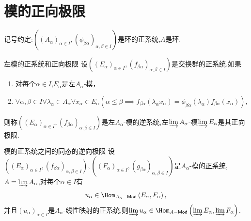 \section{模的正向极限}

记号约定:$\left(\left(A_{\alpha}\right)_{\alpha\in I},\left(\phi_{\beta\alpha}\right)_{\alpha,\beta\in I}\right)$是环的正系统,$A$是环.

\begin{definition}{左模的正系统和正向极限}{}
	设$\left(\left(E_{\alpha}\right)_{\alpha\in I},\left(f_{\beta\alpha}\right)_{\alpha,\beta\in I}\right)$是交换群的正系统.如果
	\begin{enumerate}
		\item 对每个$\alpha\in I$,$E_{\alpha}$是左$A_{\alpha}$-模，
		\item $\forall\alpha,\beta\in I\forall\lambda_{\alpha}\in A_{\alpha}\forall x_{\alpha}\in E_{\alpha}\left(\alpha\leq\beta\implies f_{\beta\alpha}\left(\lambda_{\alpha}x_{\alpha}\right)=\phi_{\beta\alpha}\left(\lambda_{\alpha}\right)f_{\beta\alpha}\left(x_{\alpha}\right)\right)$,
	\end{enumerate}
	则称$\left(\left(E_{\alpha}\right)_{\alpha\in I},\left(f_{\beta\alpha}\right)_{\alpha,\beta\in I}\right)$是左$A_{\alpha}$-模的逆系统,左$\varinjlim A_{\alpha}$-模$\varinjlim E_{\alpha}$是其正向极限.
\end{definition}

\begin{proposition}{模的正系统之间的同态的逆向极限}{}
	设$\left(\left(E_{\alpha}\right)_{\alpha\in I},\left(f_{\beta\alpha}\right)_{\alpha,\beta\in I}\right),\left(\left(F_{\alpha}\right)_{\alpha\in I},\left(g_{\beta\alpha}\right)_{\alpha,\beta\in I}\right)$是$A_{\alpha}$-模的正系统,$A=\varinjlim A_{\alpha}$,对每个$\alpha\in I$有
	\begin{align*}
		u_{\alpha}\in\Hom_{A_{\alpha}-\mathsf{Mod}}\left(E_{\alpha},F_{\alpha}\right),
	\end{align*}
	并且$\left(u_{\alpha}\right)_{\alpha\in I}$是$A_{\alpha}$-线性映射的正系统,则$\varinjlim u_{\alpha}\in\Hom_{A-\mathsf{Mod}}\left(\varinjlim E_{\alpha},\varinjlim F_{\alpha}\right)$.
\end{proposition}

